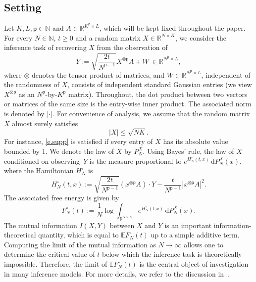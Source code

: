 \documentclass[10pt]{amsart}
\theoremstyle{definition}\newtheorem{defi}[theo]{Definition}\newtheorem{rema}[theo]{Remark}\newtheorem{exam}[theo]{Example}\newtheorem{exem}[theo]{Example}\newtheorem{nota}[theo]{Notation}
\newcommand{\N}{\mathbb{N}}
\newcommand{\R}{\mathbb{R}}
\newcommand{\E}{\mathbb{E}}
\renewcommand{\d}{\mathrm{d}}
\newcommand{\sfp}{\mathsf{p}}
\renewcommand{\leq}{\leqslant}
\renewcommand{\geq}{\geqslant}
\begin{document}
\subsection{Setting}\label{s.setting}
Let $K,L,\sfp\in\N$ and $A\in \R^{K^\sfp\times L}$, which will be kept fixed throughout the paper. For every $N\in \N$, $t\geq 0$ and a random matrix $X\in \R^{N\times K}$, we consider the inference task of recovering $X$ from the observation of
\begin{equation}\label{e.Y}
Y := \sqrt{\frac{2t}{N^{\sfp-1}}}X^{\otimes \sfp}A+W \ \in \R^{N^\sfp\times L},
\end{equation}
where $\otimes$ denotes the tensor product of matrices, and $W\in \R^{N^\sfp\times L}$, independent of the randomness of $X$, consists of independent standard Gaussian entries (we view $X^{\otimes \sfp}$ as an $N^\sfp$-by-$K^\sfp$ matrix). Throughout, the dot product between two vectors or matrices of the same size is the entry-wise inner product. The associated norm is denoted by $|\cdot|$. For convenience of analysis, we assume that the random matrix $X$ almost surely satisfies
\begin{equation}\label{e.supp}
|X|\leq \sqrt{NK}.
\end{equation}
For instance, \eqref{e.supp} is satisfied if every entry of $X$ has its absolute value bounded by $1$. We denote the law of $X$ by $P_N^X$. Using Bayes' rule, the law of $X$ conditioned on observing~$Y$ is the measure proportional to $e^{H^\circ_N(t,x)} \, \d P^X_N(x)$, where the Hamiltonian $H^\circ_N$ is
\begin{equation*}
H^\circ_N(t,x) := \sqrt{\frac{2t}{N^{\sfp-1}}}\left(x^{\otimes \sfp}A\right)\cdot Y-\frac{t}{N^{\sfp-1}}\left|x^{\otimes \sfp}A\right|^2.
\end{equation*}
The associated free energy is given by
\begin{equation*}
F^\circ_N(t) := \frac{1}{N} \log \int_{\R^{N\times K}}e^{H^\circ_N(t,x)}\, \d P^X_N(x).
\end{equation*}
The mutual information $I(X,Y)$ between $X$ and $Y$ is an important information-theoretical quantity, which is equal to $\E F^\circ_N(t)$ up to a simple additive term. Computing the limit of the mutual information as $N\to\infty$ allows one to determine the critical value of $t$ below which the inference task is theoretically impossible. Therefore, the limit of $\E F^\circ_N(t)$ is the central object of investigation in many inference models. For more details, we refer to the discussion in~\cite{barbier2016}.
\end{document}
